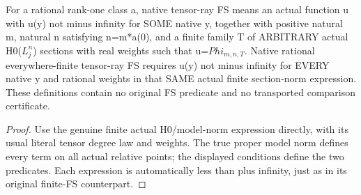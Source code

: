 \begin{definition}
\label{def:seven-native-direct-tensor-fs-classes}
\leanok
For a rational rank-one class a, native tensor-ray FS means an actual
function u with u(y) not minus infinity for SOME native y, together with
positive natural m, natural n satisfying n=m*a(0), and a finite family
T of ARBITRARY actual H0($L_j^n$) sections with real weights such that
u=$Phi_{m,n,T}$. Native rational everywhere-finite tensor-ray FS requires
u(y) not minus infinity for EVERY native y and rational weights in that
SAME actual finite section-norm expression. These definitions contain
no original FS predicate and no transported comparison certificate.
\end{definition}
\begin{proof}
Use the genuine finite actual H0/model-norm expression directly, with
its usual literal tensor degree law and weights. The true proper model
norm defines every term on all actual relative points; the displayed
conditions define the two predicates. Each expression is automatically
less than plus infinity, just as in its original finite-FS counterpart.
\end{proof}

